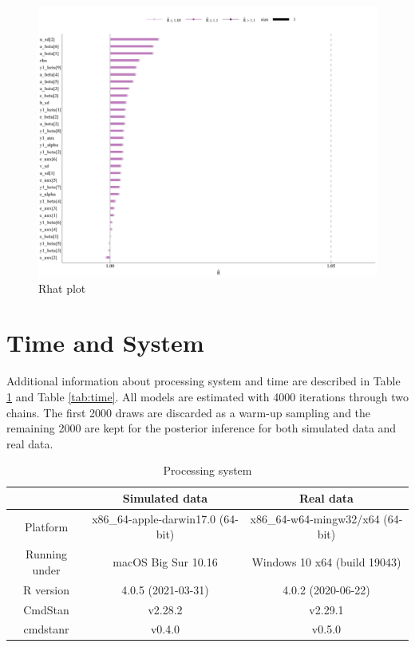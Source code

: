 \begin{figure}[H] 
\centering
\includegraphics[width=\textwidth]{Figures/Chp3_rhat.jpg}
\caption{Rhat plot}
\label{fig:rhat}
\end{figure}


\section{Time and System}

Additional information about processing system and time are described in Table \ref{tab:system} and Table \ref{tab:time}. All models are estimated with 4000 iterations through two chains. The first 2000 draws are discarded as a warm-up sampling and the remaining 2000 are kept for the posterior inference for both simulated data and real data.

\begin{table}[H] 
\centering
\caption{Processing system}
\begin{tabular}{c|c|c}
\toprule
 & \bf Simulated data & \bf Real data\\
\hline
Platform & x86\_64-apple-darwin17.0 (64-bit) & x86\_64-w64-mingw32/x64 (64-bit)\\
\hline
Running under & macOS Big Sur 10.16 & Windows 10 x64 (build 19043)\\
\hline
R version & 4.0.5 (2021-03-31) & 4.0.2 (2020-06-22) \\
\hline
CmdStan & v2.28.2 & v2.29.1 \\
cmdstanr & v0.4.0 & v0.5.0\\ 
\bottomrule
\end{tabular}
\label{tab:system}
\end{table}



